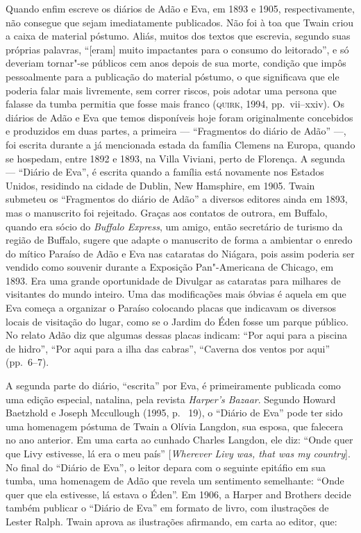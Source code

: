 Quando enfim escreve os diários de Adão e Eva, em 1893 e 1905,
respectivamente, não consegue que sejam imediatamente publicados. Não foi à toa
que Twain criou a caixa de material póstumo. Aliás, muitos dos textos que
escrevia, segundo suas próprias palavras, ``[eram] muito
impactantes para o consumo do leitorado'', e só deveriam
tornar"-se públicos cem anos depois de sua morte, condição que impôs
pessoalmente para a publicação do material póstumo, o que significava que ele
poderia falar mais livremente, sem correr riscos, pois adotar uma
persona que falasse da tumba permitia que fosse mais franco (\textsc{quirk},
1994, pp.~vii--xxiv). Os diários de Adão e Eva que temos disponíveis
hoje foram originalmente concebidos e produzidos em duas partes, a
primeira --- ``Fragmentos do diário de Adão'' ---, foi escrita durante a
já mencionada estada da família Clemens na Europa, quando se
hospedam, entre 1892 e 1893, na Villa Viviani, perto de Florença. A segunda
--- ``Diário de Eva'', é escrita quando a família está novamente nos Estados
Unidos, residindo na cidade de Dublin, New Hamsphire, em 1905. Twain submeteu os
``Fragmentos do diário de Adão'' a diversos editores ainda em 1893, mas o
manuscrito foi rejeitado. Graças aos contatos de outrora, em Buffalo, quando
era sócio do \textit{Buffalo Express}, um amigo, então secretário de turismo da
região de Buffalo, sugere que adapte o manuscrito de forma a ambientar o
enredo do mítico Paraíso de Adão e Eva nas cataratas do Niágara, pois
assim poderia ser vendido como souvenir durante a Exposição
Pan"-Americana de Chicago, em 1893. Era uma grande oportunidade de
Divulgar as cataratas para milhares de visitantes do mundo inteiro. Uma das
modificações mais óbvias é aquela em que Eva começa a organizar o Paraíso
colocando placas que indicavam os diversos locais de visitação do lugar,
como se o Jardim do Éden fosse um parque público. No relato Adão diz
que algumas dessas placas indicam: “Por aqui para a piscina de
hidro”, “Por aqui para a ilha das cabras”, “Caverna dos ventos por aqui”
(pp.~6--7).

A segunda parte do diário, ``escrita'' por Eva, é
primeiramente publicada como uma edição especial, natalina, pela revista
\textit{Harper's Bazaar}. Segundo Howard Baetzhold e Joseph Mccullough (1995, p.~
19), o ``Diário de Eva'' pode ter sido uma homenagem póstuma de Twain a Olívia
Langdon, sua esposa, que falecera no ano anterior. Em uma carta ao
cunhado Charles Langdon, ele diz: ``Onde quer que Livy estivesse,
lá era o meu país'' [\textit{Wherever Livy was, that was my country}].
No final do ``Diário de Eva'', o leitor depara com o seguinte
epitáfio em sua tumba, uma homenagem de Adão que revela um sentimento semelhante:
``Onde quer que ela estivesse, lá estava o Éden''. Em 1906, a     
Harper and Brothers decide também publicar o “Diário de Eva” em formato de
livro, com ilustrações de Lester Ralph. Twain aprova as ilustrações
afirmando, em carta ao editor, que:

